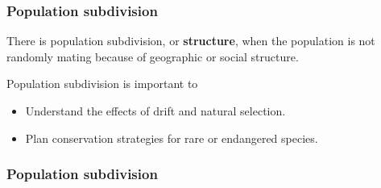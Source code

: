 \documentclass{beamer}
\newcommand{\1}{\ensuremath{\mathbf{1}}}
\begin{document}
\begin{frame}\frametitle{Population subdivision}
	\begin{block}{}
		There is population subdivision, or \textbf{structure}, when the population is not randomly mating because of geographic or social structure.
	\end{block}
	Population subdivision is important to
	\begin{itemize}
		\item Understand the effects of drift and natural selection.
		\item Plan conservation strategies for rare or endangered species.
	\end{itemize}
\end{frame}
%
%
%
\begin{frame}\frametitle{Population subdivision}
	\begin{center}
	\end{center}
\end{frame}
%
%
%
\end{document}
